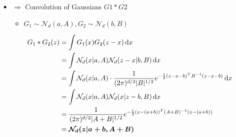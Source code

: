 \begin{itemize}
\begin{itemize}
	\item $\Rightarrow$ Convolution of Gaussians $G1* G2$
		\begin{itemize}
		\item $G_1\sim \mathcal N_d(a,A),G_2\sim \mathcal N_d(b,B)$
		\end{itemize}
		\begin{align*} \displaystyle G_1* G_2 (z) &= \int G_1(x)G_2(z-x)\mathop{}\!\mathrm{d} x \\ &= \int \mathcal N_d (x|a,A)\mathcal N_d(z-x|b,B)\mathop{}\!\mathrm{d} x \\ &= \int \mathcal N_d (x|a,A) \cdot \frac 1 {(2\pi)^{d/2} |B|^{1/2}} e^{-\frac 12 (z-x-b)^TB^{-1} (z-x-b)} \mathop{}\!\mathrm{d} x \\ &= \int \mathcal N_d (x|a,A)\mathcal N_d(x|z-b,B)\mathop{}\!\mathrm{d} x \\&= \frac 1 {(2\pi)^{d/2}|A+B|^{1/2}} e^{-\frac 12(z-(a+b))^T (A+B)^{-1} (z-(a+b))} \\&= \boldsymbol{\mathcal N_d(z|a+b,A+B)}  
		\end{align*}
	\end{itemize}
\end{itemize}
 
 
